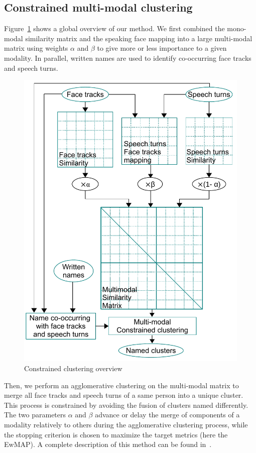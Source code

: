 \documentclass{acm_proc_article-me}
\begin{document}
\subsection{Constrained multi-modal clustering}

Figure~\ref{fig:gene} shows a global overview of our method. We first combined the mono-modal similarity matrix and the speaking face mapping into a large multi-modal matrix using weights $\alpha$ and $\beta$ to give more or less importance to a given modality. In parallel, written names are used to identify co-occurring face tracks and speech turns.

\begin{figure}[htb]
 \centering
 \includegraphics[width=0.9\linewidth]{figs/schema_clus_contraint.pdf}
 \caption {Constrained clustering overview}
 \label{fig:gene}
\end{figure}

Then, we perform an agglomerative clustering on the multi-modal matrix to merge all face tracks and speech turns of a same person into a unique cluster. This process is constrained by avoiding the fusion of clusters named differently. The two parameters $\alpha$ and $\beta$ advance or delay the merge of components of a modality relatively to others during the agglomerative clustering process, while the stopping criterion is chosen to maximize the target metrics (here the EwMAP). A complete description of this method can be found in~\cite{POIGNANT--MTAP--2015}.
\end{document}
